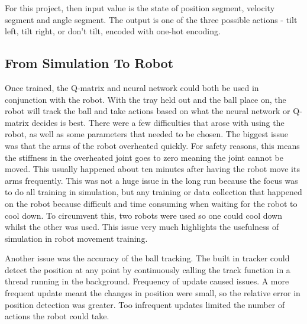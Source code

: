 \documentclass[12pt,a4paper]{article}
\begin{document}
For this project, then input value is the state of position segment, velocity segment and angle segment. The output is one of the three possible actions - tilt left, tilt right, or don't tilt, encoded with one-hot encoding. 


\subsection{From Simulation To Robot}
Once trained, the Q-matrix and neural network could both be used in conjunction with the robot. With the tray held out and the ball place on, the robot will track the ball and take actions based on what the neural network or Q-matrix decides is best. There were a few difficulties that arose with using the robot, as well as some parameters that needed to be chosen. The biggest issue was that the arms of the robot overheated quickly. For safety reasons, this means the stiffness in the overheated joint goes to zero meaning the joint cannot be moved. This usually happened about ten minutes after having the robot move its arms frequently. This was not a huge issue in the long run because the focus was to do all training in simulation, but any training or data collection that happened on the robot because difficult and time consuming when waiting for the robot to cool down. To circumvent this, two robots were used so one could cool down whilst the other was used. This issue very much highlights the usefulness of simulation in robot movement training.

Another issue was the accuracy of the ball tracking. The built in tracker could detect the position at any point by continuously calling the track function in a thread running in the background. Frequency of update caused issues. A more frequent update meant the changes in position were small, so the relative error in position detection was greater. Too infrequent updates limited the number of actions the robot could take.
\end{document}
